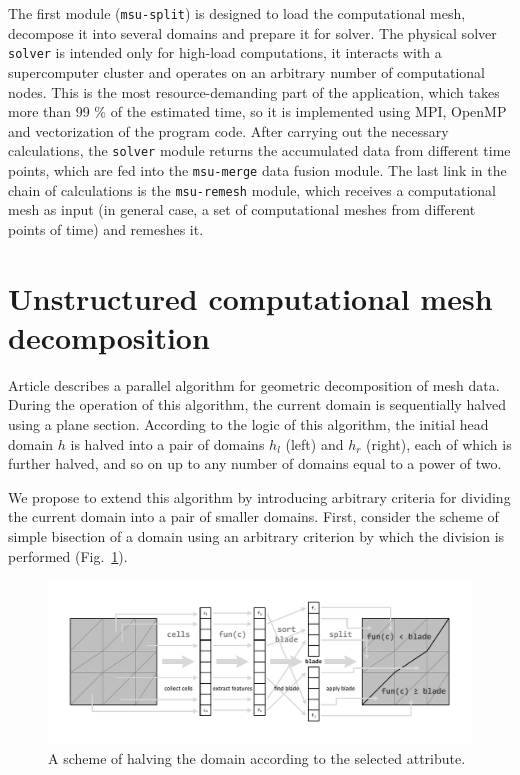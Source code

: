 \documentclass[
11pt,%
tightenlines,%
twoside,%
onecolumn,%
nofloats,%
nobibnotes,%
nofootinbib,%
superscriptaddress,%
noshowpacs,%
centertags]%
{revtex4}
\begin{document}
The first module (\texttt{msu-split}) is designed to load the computational mesh, decompose it into several domains and prepare it for solver.
The physical solver \texttt{solver} is intended only for high-load computations, it interacts with a supercomputer cluster and operates on an arbitrary number of computational nodes.
This is the most resource-demanding part of the application, which takes more than 99 \% of the estimated time, so it is implemented using MPI, OpenMP and vectorization of the program code.
After carrying out the necessary calculations, the \texttt{solver} module returns the accumulated data from different time points, which are fed into the \texttt{msu-merge} data fusion module.
The last link in the chain of calculations is the \texttt{msu-remesh} module, which receives a computational mesh as input (in general case, a set of computational meshes from different points of time) and remeshes it.

\section{Unstructured computational mesh decomposition}

Article \cite{Golovchenko_Review} describes a parallel algorithm for geometric decomposition of mesh data.
During the operation of this algorithm, the current domain is sequentially halved using a plane section.
According to the logic of this algorithm, the initial head domain $h$ is halved into a pair of domains $h_l$ (left) and $h_r$ (right), each of which is further halved, and so on up to any number of domains equal to a power of two.

We propose to extend this algorithm by introducing arbitrary criteria for dividing the current domain into a pair of smaller domains.
First, consider the scheme of simple bisection of a domain using an arbitrary criterion by which the division is performed (Fig.~\ref{fig:03-split}).

\begin{figure}[h]
\includegraphics[width=1.0\textwidth]{pics/03-split.pdf}
\caption{A scheme of halving the domain according to the selected attribute.}\label{fig:03-split}
\end{figure}
\end{document}
